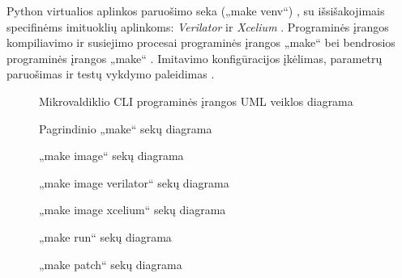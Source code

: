 Python virtualios aplinkos paruošimo seka („make venv“) \pav{\ref{fig:uml_seq_venv}}, su išsišakojimais specifinėms imituoklių aplinkoms: \textit{Verilator} \pav{\ref{fig:uml_seq_venv_verilator}} ir \textit{Xcelium} \pav{\ref{fig:uml_seq_venv_xcelium}}. Programinės įrangos kompiliavimo ir susiejimo procesai programinės įrangos „make“ \pav{\ref{fig:uml_seq_sw_make}} bei bendrosios programinės įrangos „make“ \pav{\ref{fig:uml_seq_sw_comm_make}}. Imitavimo konfigūracijos įkėlimas, parametrų paruošimas ir testų vykdymo paleidimas \pav{\ref{fig:uml_seq_sim_make}}.

\begin{figure}[H]
	
	\caption{Mikrovaldiklio CLI programinės įrangos UML veiklos diagrama}
	\label{fig:uml_activity_cli}
\end{figure}

\begin{figure}[H]
	
	\caption{Pagrindinio  „make“ sekų diagrama}
	\label{fig:uml_seq_root_make}
\end{figure}

\begin{figure}[H]
	
	\caption{„make image“ sekų diagrama}
	\label{fig:uml_seq_make_image}
\end{figure}

\begin{figure}[H]
	
	\caption{„make image verilator“ sekų diagrama}
	\label{fig:uml_seq_make_image_verilator}
\end{figure}

\begin{figure}[H]
	
	\caption{„make image xcelium“ sekų diagrama}
	\label{fig:uml_seq_make_image_xcelium}
\end{figure}

\begin{figure}[H]
	
	\caption{„make run“ sekų diagrama}
	\label{fig:uml_seq_make_run}
\end{figure}

\begin{figure}[H]
	
	\caption{„make patch“ sekų diagrama}
	\label{fig:uml_seq_make_patch}
\end{figure}

